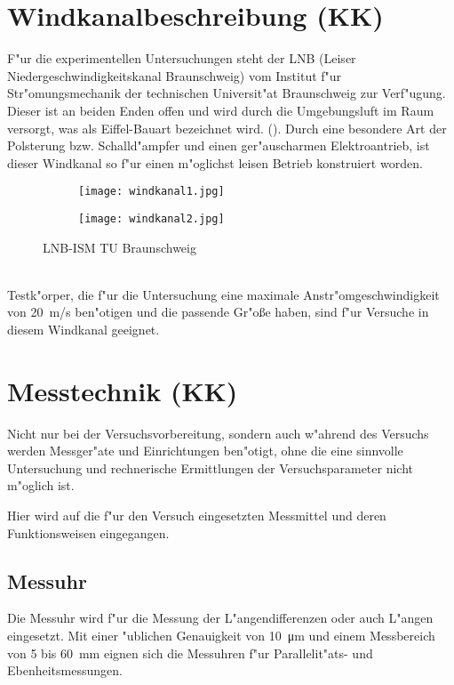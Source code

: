 \section{Windkanalbeschreibung (KK)}
F"ur die experimentellen Untersuchungen steht der LNB (Leiser Niedergeschwindigkeitskanal Braunschweig) vom Institut f"ur Str"omungsmechanik der technischen  Universit"at Braunschweig zur Verf"ugung.\\
Dieser ist an beiden Enden offen und wird durch die Umgebungsluft im Raum versorgt, was als Eiffel-Bauart bezeichnet wird. ().
Durch eine besondere Art der Polsterung bzw. Schalld"ampfer und einen
ger"auscharmen Elektroantrieb, ist dieser Windkanal so f"ur einen m"oglichst leisen Betrieb konstruiert worden.
\begin{figure}[h]
	\centering
	\begin{subfigure}[c]{0.5\textwidth}		
		\texttt{[image: windkanal1.jpg]}
	\end{subfigure}
	\begin{subfigure}[c]{0.5\textwidth}
		\texttt{[image: windkanal2.jpg]}
	\end{subfigure}
	\caption{LNB-ISM TU Braunschweig}
	\label{fig:windkanal}
\end{figure}\\
Testk"orper, die f"ur die Untersuchung eine maximale Anstr"omgeschwindigkeit von \SI{20}{\meter/\second} ben"otigen und die passende Gr"o\ss{}e haben, sind f"ur Versuche in diesem Windkanal geeignet.

\section{Messtechnik (KK)}
Nicht nur bei der Versuchsvorbereitung, sondern auch w"ahrend des Versuchs werden Messger"ate und Einrichtungen ben"otigt, ohne die eine sinnvolle Untersuchung und rechnerische Ermittlungen der Versuchsparameter nicht m"oglich ist.

Hier wird auf die f"ur den Versuch eingesetzten Messmittel und deren Funktionsweisen eingegangen.

\subsection{Messuhr}
Die Messuhr wird f"ur die Messung der L"angendifferenzen oder auch L"angen eingesetzt. Mit einer "ublichen Genauigkeit von \SI{10}{\micro\meter} und einem Messbereich von 5 bis \SI{60}{\milli\meter} eignen sich die Messuhren f"ur Parallelit"ats- und Ebenheitsmessungen.

